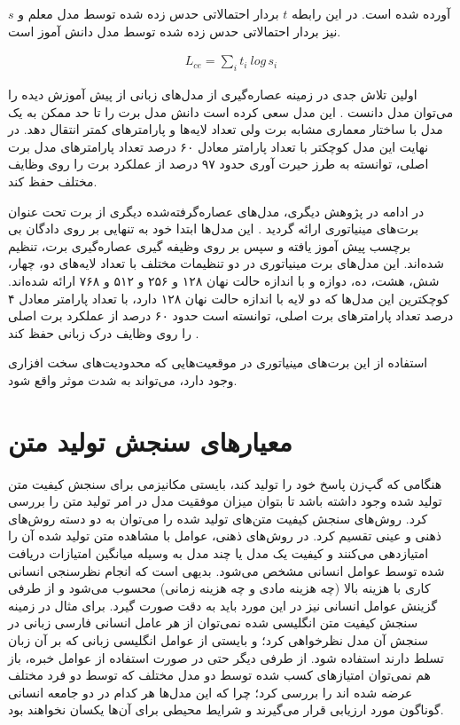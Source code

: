 آورده شده است. در این رابطه $t$ بردار احتمالاتی حدس زده شده توسط مدل معلم و $s$ نیز بردار احتمالاتی حدس زده شده توسط مدل دانش آموز است.

\begin{align} \label{eq:cross_distill}
L_{ce} = \sum_{i}^{} t_i\:log\,s_i
\end{align}

اولین تلاش جدی در زمینه عصاره‌گیری از مدل‌های زبانی از پیش آموزش دیده را می‌توان مدل 
دانست
\cite{sanh2019distilbert}.
این مدل سعی کرده است دانش مدل برت را 
تا حد ممکن به یک مدل با ساختار معماری مشابه برت ولی تعداد  لایه‌ها و پارامتر‌های کمتر انتقال دهد. در نهایت این مدل کوچکتر با تعداد پارامتر معادل ۶۰ درصد تعداد پارامتر‌های مدل برت اصلی،
توانسته به طرز حیرت آوری حدود ۹۷ درصد از عملکرد برت را روی وظایف مختلف حفظ کند. 

در ادامه در پژوهش دیگری، مدل‌های عصاره‌گرفته‌شده دیگری از برت تحت عنوان برت‌های مینیاتوری ارائه گردید
\cite{turc2019well}.
این مدل‌ها ابتدا خود به تنهایی بر روی دادگان بی برچسب پیش آموز یافته و سپس بر روی وظیفه گیری عصاره‌گیری برت، تنظیم شده‌اند. این مدل‌های برت مینیاتوری در دو تنظیمات مختلف 
با تعداد لایه‌های دو، چهار، شش، هشت، ده، دوازه و با اندازه حالت نهان ۱۲۸ و ۲۵۶ و ۵۱۲ و ۷۶۸ ارائه شده‌اند. کوچکترین این مدل‌ها که دو لایه با اندازه حالت نهان ۱۲۸ دارد، با تعداد پارامتر معادل ۴ درصد تعداد پارامترهای برت اصلی، توانسته است حدود ۶۰ درصد از عملکرد برت‌ اصلی را روی وظایف درک زبانی حفظ کند
\cite{turc2019well}.

استفاده از این برت‌های مینیاتوری در موقعیت‌هایی که محدودیت‌های سخت افزاری وجود دارد، می‌تواند به شدت موثر واقع شود.

\section{معیارهای سنجش تولید متن}

هنگامی که گپ‌زن پاسخ‌ خود را تولید کند، بایستی مکانیزمی برای سنجش کیفیت متن تولید شده وجود داشته باشد تا بتوان میزان موفقیت مدل در امر تولید متن را بررسی کرد. روش‌های سنجش کیفیت متن‌های تولید شده را 
می‌توان به دو دسته‌ روش‌های ذهنی و عینی تقسیم کرد. در روش‌های ذهنی، عوامل با مشاهده متن تولید شده آن را امتیازدهی می‌کنند و کیفیت یک مدل یا چند مدل به وسیله میانگین امتیازات دریافت شده توسط عوامل انسانی مشخص می‌شود. بدیهی است که انجام نظرسنجی انسانی کاری با هزینه بالا (چه هزینه مادی و چه هزینه زمانی) محسوب می‌شود و از طرفی گزینش عوامل انسانی نیز در این مورد باید به دقت صورت گیرد. برای مثال در زمینه سنجش کیفیت متن انگلیسی شده نمی‌توان از هر عامل انسانی فارسی زبانی در سنجش آن مدل نظرخواهی کرد؛ و بایستی از عوامل انگلیسی زبانی که بر آن زبان تسلط دارند استفاده شود. از طرفی دیگر حتی در صورت استفاده از عوامل خبره، باز هم نمی‌توان امتیازهای کسب شده توسط دو مدل مختلف که توسط دو فرد مختلف عرضه شده اند را بررسی کرد؛ چرا که این مدل‌ها هر کدام در دو جامعه انسانی گوناگون مورد ارزیابی قرار می‌‌گیرند و شرایط محیطی برای آن‌ها یکسان نخواهند بود. 

